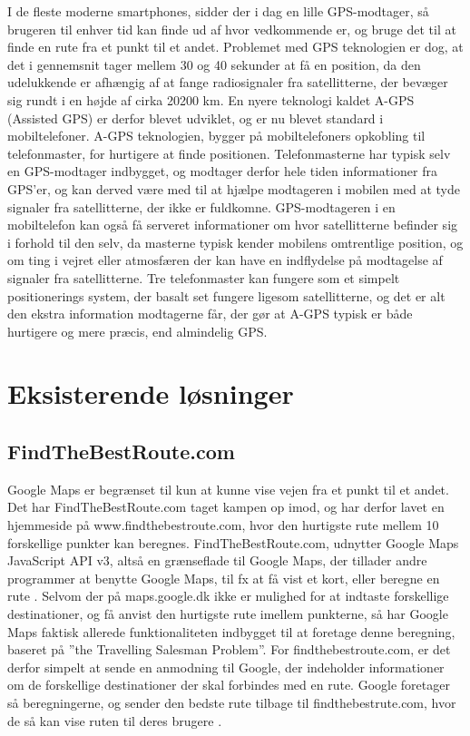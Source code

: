 I de fleste moderne smartphones, sidder der i dag en lille GPS-modtager, så brugeren til enhver tid kan finde ud af hvor vedkommende er, og bruge det til at finde en rute fra et punkt til et andet. Problemet med GPS teknologien er dog, at det i gennemsnit tager mellem 30 og 40 sekunder at få en position, da den udelukkende er afhængig af at fange radiosignaler fra satellitterne, der bevæger sig rundt i en højde af cirka 20200 km.  En nyere teknologi kaldet A-GPS (Assisted GPS) er derfor blevet udviklet, og er nu blevet standard i mobiltelefoner. A-GPS teknologien, bygger på mobiltelefoners opkobling til telefonmaster, for hurtigere at finde positionen. Telefonmasterne har typisk selv en GPS-modtager indbygget, og modtager derfor hele tiden informationer fra GPS’er, og kan derved være med til at hjælpe modtageren i mobilen med at tyde signaler fra satellitterne, der ikke er fuldkomne. GPS-modtageren i en mobiltelefon kan også få serveret informationer om hvor satellitterne befinder sig i forhold til den selv, da masterne typisk kender mobilens omtrentlige position, og om ting i vejret eller atmosfæren der kan have en indflydelse på modtagelse af signaler fra satellitterne. 
Tre telefonmaster kan fungere som et simpelt positionerings system, der basalt set fungere ligesom satellitterne, og det er alt den ekstra information modtagerne får, der gør at A-GPS typisk er både hurtigere og mere præcis, end almindelig GPS.

\section{Eksisterende løsninger}
\subsection{FindTheBestRoute.com}
Google Maps er begrænset til kun at kunne vise vejen fra et punkt til et andet. Det har FindTheBestRoute.com taget kampen op imod, og har derfor lavet en hjemmeside på www.findthebestroute.com, hvor den hurtigste rute mellem 10 forskellige punkter kan beregnes. FindTheBestRoute.com, udnytter Google Maps JavaScript API v3, altså en grænseflade til Google Maps, der tillader andre programmer at benytte Google Maps, til fx at få vist et kort, eller beregne en rute \citep{ftbr}. Selvom der på maps.google.dk ikke er mulighed for at indtaste forskellige destinationer, og få anvist den hurtigste rute imellem punkterne, så har Google Maps faktisk allerede funktionaliteten indbygget til at foretage denne beregning, baseret på ”the Travelling Salesman Problem”. For findthebestroute.com, er det derfor simpelt at sende en anmodning til Google, der indeholder informationer om de forskellige destinationer der skal forbindes med en rute. Google foretager så beregningerne, og sender den bedste rute tilbage til findthebestrute.com, hvor de så kan vise ruten til deres brugere \citep{googleapi}.

